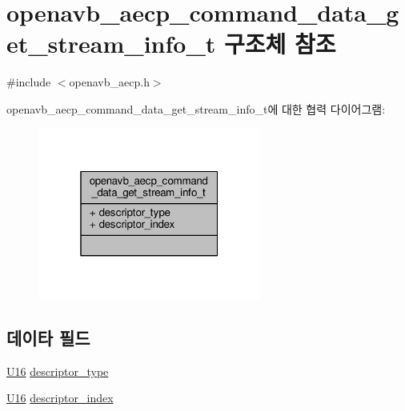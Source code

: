 \hypertarget{structopenavb__aecp__command__data__get__stream__info__t}{}\section{openavb\+\_\+aecp\+\_\+command\+\_\+data\+\_\+get\+\_\+stream\+\_\+info\+\_\+t 구조체 참조}
\label{structopenavb__aecp__command__data__get__stream__info__t}


{\ttfamily \#include $<$openavb\+\_\+aecp.\+h$>$}



openavb\+\_\+aecp\+\_\+command\+\_\+data\+\_\+get\+\_\+stream\+\_\+info\+\_\+t에 대한 협력 다이어그램\+:
\nopagebreak
\begin{figure}[H]
\begin{center}
\leavevmode
\includegraphics[width=208pt]{structopenavb__aecp__command__data__get__stream__info__t__coll__graph}
\end{center}
\end{figure}
\subsection*{데이타 필드}
\begin{DoxyCompactItemize}
\item 
\hyperlink{openavb__types__base__pub_8h_a0a0a322d5fa4a546d293a77ba8b4a71f}{U16} \hyperlink{structopenavb__aecp__command__data__get__stream__info__t_a1e231d7874aada5925b29affc76782cc}{descriptor\+\_\+type}
\item 
\hyperlink{openavb__types__base__pub_8h_a0a0a322d5fa4a546d293a77ba8b4a71f}{U16} \hyperlink{structopenavb__aecp__command__data__get__stream__info__t_ab26fb363c24b9a2a4391f9171c981b08}{descriptor\+\_\+index}
\end{DoxyCompactItemize}


